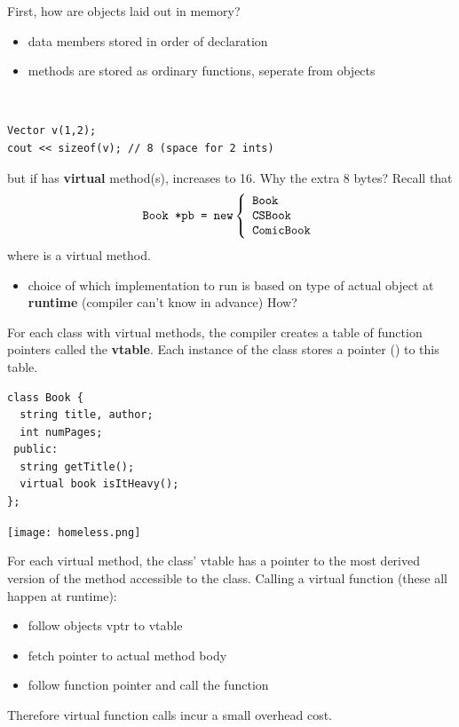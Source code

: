 \documentclass[english, 11pt]{article}
\begin{document}
First, how are objects laid out in memory?
\begin{itemize}
  \item data members stored in order of declaration
  \item methods are stored as ordinary functions, seperate from objects
\end{itemize}
\begin{exmp}
  \
  \begin{lstlisting}
Vector v(1,2);
cout << sizeof(v); // 8 (space for 2 ints)
  \end{lstlisting}
  but if  has \textbf{virtual} method(s),  increases to 16. Why the extra 8 bytes? Recall that
  \[ \mbox{\texttt{Book *pb = new}} \left\{ \begin{array}{l}
      \mbox{\texttt{Book}} \\ \mbox{\texttt{CSBook}} \\ \mbox{\texttt{ComicBook}}
     \end{array}  \right.\]
  where  is a virtual method.
  \begin{itemize}
    \item choice of which implementation to run is based on type of actual object at \textbf{runtime} (compiler can't know in advance) How?
  \end{itemize}

  For each class with virtual methods, the compiler creates a table of function pointers called the \textbf{vtable}. Each instance of the class stores a pointer () to this table.

\end{exmp}

\begin{exmp}
\begin{lstlisting}
class Book {
  string title, author;
  int numPages;
 public:
  string getTitle();
  virtual book isItHeavy();
};
\end{lstlisting}
\begin{center}
  \texttt{[image: homeless.png]}
\end{center}

\end{exmp}

For each virtual method, the class' vtable has a pointer to the most derived version of the method accessible to the class. Calling a virtual function (these all happen at runtime):
\begin{itemize}
  \item follow objects vptr to vtable
  \item fetch pointer to actual method body
  \item follow function pointer and call the function
\end{itemize}
Therefore virtual function calls incur a small overhead cost. \\
\end{document}
